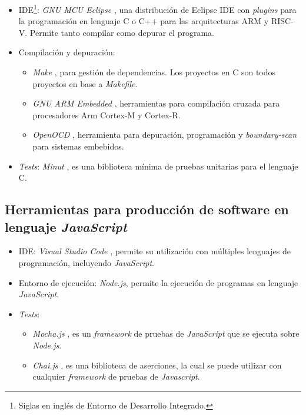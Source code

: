 \begin{itemize}
\item
IDE\footnote{Siglas en inglés de Entorno de Desarrollo Integrado.}: \emph{GNU MCU Eclipse} \citep{GNUMCUEclipse}, una distribución de Eclipse IDE con \emph{plugins} para la programación en lenguaje C o C++ para las arquitecturas ARM y RISC-V. Permite tanto compilar como depurar el programa.
\item
Compilación y depuración:
\begin{itemize}
\item
\emph{Make} \citep{Make}, para gestión de dependencias. Los proyectos en C son todos proyectos en base a \emph{Makefile}.
\item
\emph{GNU ARM Embedded} \citep{Toolchain}, herramientas para compilación cruzada para procesadores Arm Cortex-M y Cortex-R.
\item
\emph{OpenOCD} \citep{OpenOCD}, herramienta para depuración, programación y \emph{boundary-scan} para sistemas embebidos.
\end{itemize}
\item
\emph{Tests}: \emph{Minut} \citep{Minut}, es una biblioteca mínima de pruebas unitarias para el lenguaje C.
\end{itemize}

\subsection{Herramientas para producción de software en lenguaje \emph{JavaScript}}

\begin{itemize}
\item
IDE: \emph{Visual Studio Code} \citep{vscode}, permite su utilización con múltiples lenguajes de programación, incluyendo \emph{JavaScript}.
\item
Entorno de ejecución: \emph{Node.js}, permite la ejecución de programas en lenguaje \emph{JavaScript}.
\item
\emph{Tests}:
\begin{itemize}
\item
\emph{Mocha.js} \citep{Mocha}, es un \emph{framework} de pruebas de \emph{JavaScript} que se ejecuta sobre \emph{Node.js}.
\item
\emph{Chai.js} \citep{Chai}, es una biblioteca de aserciones, la cual se puede utilizar con cualquier \emph{framework} de pruebas de \emph{Javascript}.
\end{itemize}
\end{itemize}

